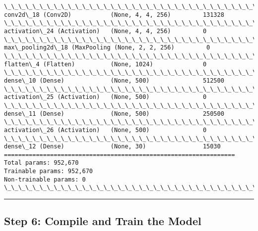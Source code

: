 \documentclass[11pt]{article}
\begin{document}
\begin{Verbatim}[commandchars=\\\{\}]
\_\_\_\_\_\_\_\_\_\_\_\_\_\_\_\_\_\_\_\_\_\_\_\_\_\_\_\_\_\_\_\_\_\_\_\_\_\_\_\_\_\_\_\_\_\_\_\_\_\_\_\_\_\_\_\_\_\_\_\_\_\_\_\_\_
conv2d\_18 (Conv2D)           (None, 4, 4, 256)         131328    
\_\_\_\_\_\_\_\_\_\_\_\_\_\_\_\_\_\_\_\_\_\_\_\_\_\_\_\_\_\_\_\_\_\_\_\_\_\_\_\_\_\_\_\_\_\_\_\_\_\_\_\_\_\_\_\_\_\_\_\_\_\_\_\_\_
activation\_24 (Activation)   (None, 4, 4, 256)         0         
\_\_\_\_\_\_\_\_\_\_\_\_\_\_\_\_\_\_\_\_\_\_\_\_\_\_\_\_\_\_\_\_\_\_\_\_\_\_\_\_\_\_\_\_\_\_\_\_\_\_\_\_\_\_\_\_\_\_\_\_\_\_\_\_\_
max\_pooling2d\_18 (MaxPooling (None, 2, 2, 256)         0         
\_\_\_\_\_\_\_\_\_\_\_\_\_\_\_\_\_\_\_\_\_\_\_\_\_\_\_\_\_\_\_\_\_\_\_\_\_\_\_\_\_\_\_\_\_\_\_\_\_\_\_\_\_\_\_\_\_\_\_\_\_\_\_\_\_
flatten\_4 (Flatten)          (None, 1024)              0         
\_\_\_\_\_\_\_\_\_\_\_\_\_\_\_\_\_\_\_\_\_\_\_\_\_\_\_\_\_\_\_\_\_\_\_\_\_\_\_\_\_\_\_\_\_\_\_\_\_\_\_\_\_\_\_\_\_\_\_\_\_\_\_\_\_
dense\_10 (Dense)             (None, 500)               512500    
\_\_\_\_\_\_\_\_\_\_\_\_\_\_\_\_\_\_\_\_\_\_\_\_\_\_\_\_\_\_\_\_\_\_\_\_\_\_\_\_\_\_\_\_\_\_\_\_\_\_\_\_\_\_\_\_\_\_\_\_\_\_\_\_\_
activation\_25 (Activation)   (None, 500)               0         
\_\_\_\_\_\_\_\_\_\_\_\_\_\_\_\_\_\_\_\_\_\_\_\_\_\_\_\_\_\_\_\_\_\_\_\_\_\_\_\_\_\_\_\_\_\_\_\_\_\_\_\_\_\_\_\_\_\_\_\_\_\_\_\_\_
dense\_11 (Dense)             (None, 500)               250500    
\_\_\_\_\_\_\_\_\_\_\_\_\_\_\_\_\_\_\_\_\_\_\_\_\_\_\_\_\_\_\_\_\_\_\_\_\_\_\_\_\_\_\_\_\_\_\_\_\_\_\_\_\_\_\_\_\_\_\_\_\_\_\_\_\_
activation\_26 (Activation)   (None, 500)               0         
\_\_\_\_\_\_\_\_\_\_\_\_\_\_\_\_\_\_\_\_\_\_\_\_\_\_\_\_\_\_\_\_\_\_\_\_\_\_\_\_\_\_\_\_\_\_\_\_\_\_\_\_\_\_\_\_\_\_\_\_\_\_\_\_\_
dense\_12 (Dense)             (None, 30)                15030     
=================================================================
Total params: 952,670
Trainable params: 952,670
Non-trainable params: 0
\_\_\_\_\_\_\_\_\_\_\_\_\_\_\_\_\_\_\_\_\_\_\_\_\_\_\_\_\_\_\_\_\_\_\_\_\_\_\_\_\_\_\_\_\_\_\_\_\_\_\_\_\_\_\_\_\_\_\_\_\_\_\_\_\_

    \end{Verbatim}

    \begin{center}\rule{0.5\linewidth}{\linethickness}\end{center}

\subsection{Step 6: Compile and Train the
Model}\label{step-6-compile-and-train-the-model}
\end{document}
